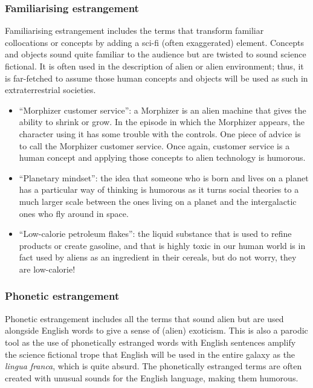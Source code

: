 \documentclass[output=paper]{langscibook}
\begin{document}
\subsubsection{Familiarising estrangement}

Familiarising estrangement includes the terms that transform familiar collocations or concepts by adding a sci-fi (often exaggerated) element. Concepts and objects sound quite familiar to the audience but are twisted to sound science fictional. It is often used in the description of alien or alien environment; thus, it is far-fetched to assume those human concepts and objects will be used as such in extraterrestrial societies.

\begin{itemize}
\item “Morphizer customer service”: a Morphizer is an alien machine that gives the ability to shrink or grow. In the episode in which the Morphizer appears, the character using it has some trouble with the controls. One piece of advice is to call the Morphizer customer service. Once again, customer service is a human concept and applying those concepts to alien technology is humorous.
\item “Planetary mindset”: the idea that someone who is born and lives on a planet has a particular way of thinking is humorous as it turns social theories to a much larger scale between the ones living on a planet and the intergalactic ones who fly around in space.
\item “Low-calorie petroleum flakes”: the liquid substance that is used to refine products or create gasoline, and that is highly toxic in our human world is in fact used by aliens as an ingredient in their cereals, but do not worry, they are low-calorie!
\end{itemize}

\subsubsection{Phonetic estrangement}

Phonetic estrangement includes all the terms that sound alien but are used alongside English words to give a sense of (alien) exoticism. This is also a parodic tool as the use of phonetically estranged words with English sentences amplify the science fictional trope that English will be used in the entire galaxy as the \textit{lingua franca}, which is quite absurd. The phonetically estranged terms are often created with unusual sounds for the English language, making them humorous.
\end{document}
